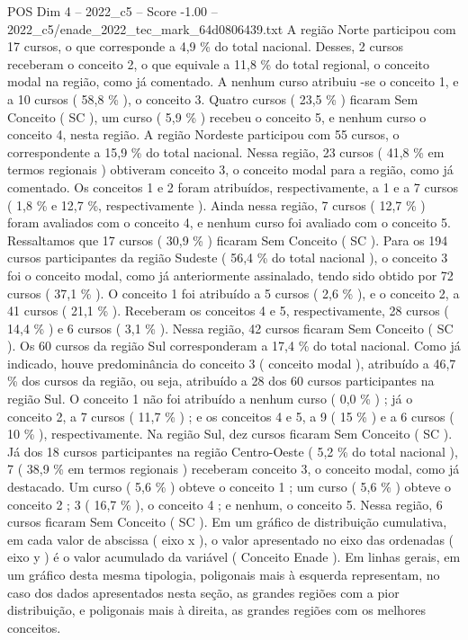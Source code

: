 \begin{textsample}{POS Dim 4 – 2022\_c5 – Score -1.00 – 2022\_c5/enade\_2022\_tec\_mark\_64d0806439.txt}
A região Norte participou com 17 cursos, o que corresponde a 4,9 \% do total nacional.
Desses, 2 cursos receberam o conceito 2, o que equivale a 11,8 \% do total regional, o conceito modal na região, como já comentado.
A nenhum curso atribuiu -se o conceito 1, e a 10 cursos ( 58,8 \% ), o conceito 3.
Quatro cursos ( 23,5 \% ) ficaram Sem Conceito ( SC ), um curso ( 5,9 \% ) recebeu o conceito 5, e nenhum curso o conceito 4, nesta região.
A região Nordeste participou com 55 cursos, o correspondente a 15,9 \% do total nacional.
Nessa região, 23 cursos ( 41,8 \% em termos regionais ) obtiveram conceito 3, o conceito modal para a região, como já comentado.
Os conceitos 1 e 2 foram atribuídos, respectivamente, a 1 e a 7 cursos ( 1,8 \% e 12,7 \%, respectivamente ).
Ainda nessa região, 7 cursos ( 12,7 \% ) foram avaliados com o conceito 4, e nenhum curso foi avaliado com o conceito 5.
Ressaltamos que 17 cursos ( 30,9 \% ) ficaram Sem Conceito ( SC ).
Para os 194 cursos participantes da região Sudeste ( 56,4 \% do total nacional ), o conceito 3 foi o conceito modal, como já anteriormente assinalado, tendo sido obtido por 72 cursos ( 37,1 \% ).
O conceito 1 foi atribuído a 5 cursos ( 2,6 \% ), e o conceito 2, a 41 cursos ( 21,1 \% ).
Receberam os conceitos 4 e 5, respectivamente, 28 cursos ( 14,4 \% ) e 6 cursos ( 3,1 \% ).
Nessa região, 42 cursos ficaram Sem Conceito ( SC ).
Os 60 cursos da região Sul corresponderam a 17,4 \% do total nacional.
Como já indicado, houve predominância do conceito 3 ( conceito modal ), atribuído a 46,7 \% dos cursos da região, ou seja, atribuído a 28 dos 60 cursos participantes na região Sul.
O conceito 1 não foi atribuído a nenhum curso ( 0,0 \% ) ; já o conceito 2, a 7 cursos ( 11,7 \% ) ; e os conceitos 4 e 5, a 9 ( 15 \% ) e a 6 cursos ( 10 \% ), respectivamente.
Na região Sul, dez cursos ficaram Sem Conceito ( SC ).
Já dos 18 cursos participantes na região Centro-Oeste ( 5,2 \% do total nacional ), 7 ( 38,9 \% em termos regionais ) receberam conceito 3, o conceito modal, como já destacado.
Um curso ( 5,6 \% ) obteve o conceito 1 ; um curso ( 5,6 \% ) obteve o conceito 2 ; 3 ( 16,7 \% ), o conceito 4 ; e nenhum, o conceito 5.
Nessa região, 6 cursos ficaram Sem Conceito ( SC ).
Em um gráfico de distribuição cumulativa, em cada valor de abscissa ( eixo x ), o valor apresentado no eixo das ordenadas ( eixo y ) é o valor acumulado da variável ( Conceito Enade ).
Em linhas gerais, em um gráfico desta mesma tipologia, poligonais mais à esquerda representam, no caso dos dados apresentados nesta seção, as grandes regiões com a pior distribuição, e poligonais mais à direita, as grandes regiões com os melhores conceitos.

\end{textsample}
